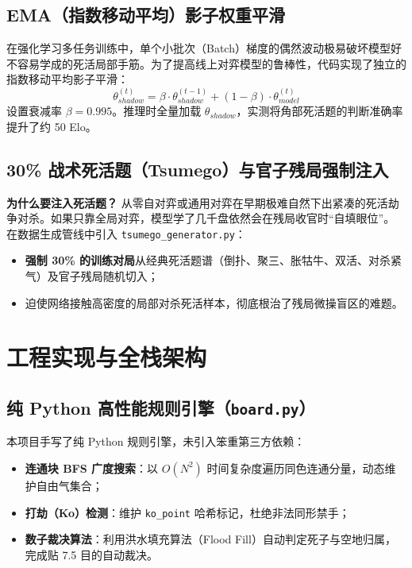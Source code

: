 \documentclass[11pt,a4paper]{ctexart}
\begin{document}
\subsection{EMA（指数移动平均）影子权重平滑}

在强化学习多任务训练中，单个小批次（Batch）梯度的偶然波动极易破坏模型好不容易学成的死活局部手筋。为了提高线上对弈模型的鲁棒性，代码实现了独立的指数移动平均影子平滑：
\begin{equation}
\theta_{shadow}^{(t)} = \beta \cdot \theta_{shadow}^{(t-1)} + (1 - \beta) \cdot \theta_{model}^{(t)}
\end{equation}
设置衰减率 $\beta = 0.995$。推理时全量加载 $\theta_{shadow}$，实测将角部死活题的判断准确率提升了约 50 Elo。

\subsection{30\% 战术死活题（Tsumego）与官子残局强制注入}

\textbf{为什么要注入死活题？} 从零自对弈或通用对弈在早期极难自然下出紧凑的死活劫争对杀。如果只靠全局对弈，模型学了几千盘依然会在残局收官时“自填眼位”。
在数据生成管线中引入 \texttt{tsumego_generator.py}：
\begin{itemize}
  \item \textbf{强制 30\% 的训练对局}从经典死活题谱（倒扑、聚三、胀牯牛、双活、对杀紧气）及官子残局随机切入；
  \item 迫使网络接触高密度的局部对杀死活样本，彻底根治了残局微操盲区的难题。
\end{itemize}

\newpage
\section{工程实现与全栈架构}

\subsection{纯 Python 高性能规则引擎（\texttt{board.py}）}

本项目手写了纯 Python 规则引擎，未引入笨重第三方依赖：
\begin{itemize}
  \item \textbf{连通块 BFS 广度搜索}：以 $O(N^2)$ 时间复杂度遍历同色连通分量，动态维护自由气集合；
  \item \textbf{打劫（Ko）检测}：维护 \texttt{ko\_point} 哈希标记，杜绝非法同形禁手；
  \item \textbf{数子裁决算法}：利用洪水填充算法（Flood Fill）自动判定死子与空地归属，完成贴 7.5 目的自动裁决。
\end{itemize}
\end{document}
